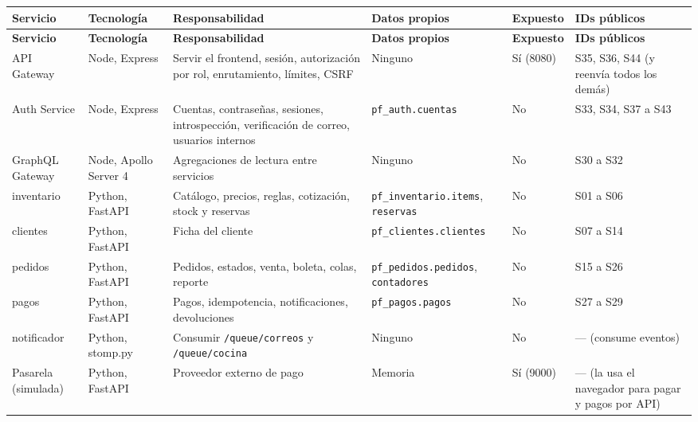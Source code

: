 {\footnotesize
\setlength{\tabcolsep}{3pt}\renewcommand{\arraystretch}{1.15}
\begin{longtable}{|>{\raggedright\arraybackslash}p{}|>{\raggedright\arraybackslash}p{}|>{\raggedright\arraybackslash}p{}|>{\raggedright\arraybackslash}p{}|>{\raggedright\arraybackslash}p{}|>{\raggedright\arraybackslash}p{}|}
\hline
\textbf{Servicio} & \textbf{Tecnología} & \textbf{Responsabilidad} & \textbf{Datos propios} & \textbf{Expuesto} & \textbf{IDs públicos} \\ \hline
\endfirsthead
\hline
\textbf{Servicio} & \textbf{Tecnología} & \textbf{Responsabilidad} & \textbf{Datos propios} & \textbf{Expuesto} & \textbf{IDs públicos} \\ \hline
\endhead
API Gateway & Node, Express & Servir el frontend, sesión, autorización por rol, enrutamiento, límites, CSRF & Ninguno & Sí (8080) & S35, S36, S44 (y reenvía todos los demás) \\ \hline
Auth Service & Node, Express & Cuentas, contraseñas, sesiones, introspección, verificación de correo, usuarios internos & \texttt{pf\_\allowbreak{}auth.\allowbreak{}cuentas} & No & S33, S34, S37 a S43 \\ \hline
GraphQL Gateway & Node, Apollo Server 4 & Agregaciones de lectura entre servicios & Ninguno & No & S30 a S32 \\ \hline
inventario & Python, FastAPI & Catálogo, precios, reglas, cotización, stock y reservas & \texttt{pf\_\allowbreak{}inventario.\allowbreak{}items}, \texttt{reservas} & No & S01 a S06 \\ \hline
clientes & Python, FastAPI & Ficha del cliente & \texttt{pf\_\allowbreak{}clientes.\allowbreak{}clientes} & No & S07 a S14 \\ \hline
pedidos & Python, FastAPI & Pedidos, estados, venta, boleta, colas, reporte & \texttt{pf\_\allowbreak{}pedidos.\allowbreak{}pedidos}, \texttt{contadores} & No & S15 a S26 \\ \hline
pagos & Python, FastAPI & Pagos, idempotencia, notificaciones, devoluciones & \texttt{pf\_\allowbreak{}pagos.\allowbreak{}pagos} & No & S27 a S29 \\ \hline
notificador & Python, stomp.py & Consumir \texttt{/\allowbreak{}queue/\allowbreak{}correos} y \texttt{/\allowbreak{}queue/\allowbreak{}cocina} & Ninguno & No & — (consume eventos) \\ \hline
Pasarela (simulada) & Python, FastAPI & Proveedor externo de pago & Memoria & Sí (9000) & — (la usa el navegador para pagar y pagos por API) \\ \hline
\end{longtable}
}

